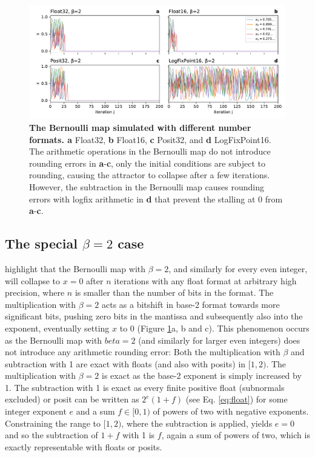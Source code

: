\begin{figure}[tbhp]
	\includegraphics[width=1\textwidth]{Figures/orbits/beta2.pdf}
	\caption{\textbf{The Bernoulli map simulated with different number formats. a}
	Float32, \textbf{b} Float16, \textbf{c} Posit32, and \textbf{d} LogFixPoint16. The arithmetic operations in the
	Bernoulli map do not introduce rounding errors in \textbf{a}-\textbf{c}, only the initial conditions are subject
	to rounding, causing the attractor to collapse after a few iterations. However, the subtraction in the Bernoulli
	map causes rounding errors with logfix arithmetic in \textbf{d} that prevent the stalling at 0 from \textbf{a}-\textbf{c}.}
	\label{fig:orbits_beta2}
\end{figure}

\subsection{The special $\beta = 2$ case}
\label{sec:orbits_beta2}

\cite{Boghosian2019} highlight that the Bernoulli map with $\beta = 2$, and similarly for every even integer, will collapse to $x=0$
after $n$ iterations with any float format at arbitrary high precision, where $n$ is smaller than the number of bits in the format.
The multiplication with $\beta = 2$ acts as a bitshift in base-2 format towards more significant bits, pushing zero bits in the mantissa
and subsequently also into the exponent, eventually setting $x$ to 0 (Figure \ref{fig:orbits_beta2}a, b and c). This phenomenon occurs
as the Bernoulli map with $beta=2$ (and similarly for larger even integers) does not introduce any arithmetic rounding error: Both the
multiplication with $\beta$ and subtraction with 1 are exact with floats (and also with posits) in $[1,2)$. The multiplication with $\beta=2$
is exact as the base-2 exponent is simply increased by 1. The subtraction with 1 is exact as every finite positive float (subnormals excluded)
or posit can be written as $2^e(1+f)$ (see Eq. \ref{eq:float}) for some integer exponent $e$ and a sum $f \in [0,1)$ of powers of two
with negative exponents. Constraining the range to $[1,2)$, where the subtraction is applied, yields $e=0$ and so the subtraction of $1+f$
with 1 is $f$, again a sum of powers of two, which is exactly representable with floats or posits.

